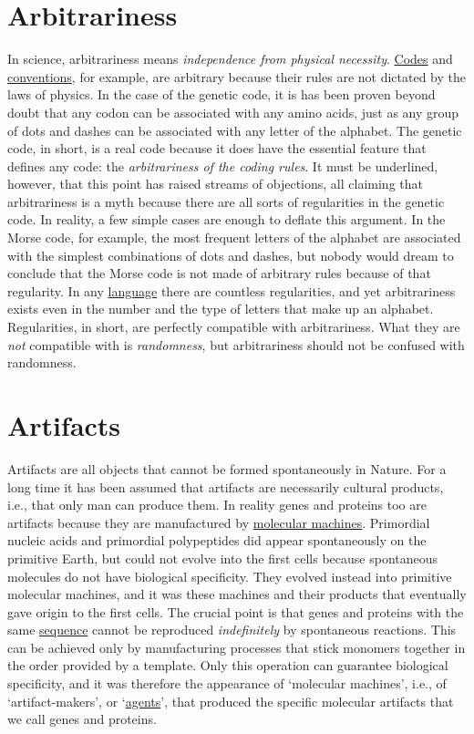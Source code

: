 \documentclass[12pt]{article}
\begin{document}
\section{Arbitrariness}
In science, arbitrariness means \textit{independence from physical necessity}. \hyperlink{code}{Codes} and \hyperlink{convention}{conventions}, for example, are arbitrary because their rules are not dictated by the laws of physics. In the case of the genetic code, it is has been proven beyond doubt that any codon can be associated with any amino acids, just as any group of dots and dashes can be associated with any letter of the alphabet. The genetic code, in short, is a real code because it does have the essential feature that defines any code: the \textit{arbitrariness of the coding rules}. It must be underlined, however, that this point has raised streams of objections, all claiming that arbitrariness is a myth because there are all sorts of regularities in the genetic code. In reality, a few simple cases are enough to deflate this argument. In the Morse code, for example, the most frequent letters of the alphabet are associated with the simplest combinations of dots and dashes, but nobody would dream to conclude that the Morse code is not made of arbitrary rules because of that regularity. In any \hyperlink{language}{language} there are countless regularities, and yet arbitrariness exists even in the number and the type of letters that make up an alphabet. Regularities, in short, are perfectly compatible with arbitrariness. What they are \textit{not} compatible with is \textit{randomness}, but arbitrariness should not be confused with randomness.


\hypertarget{artifacts}{}
\section{Artifacts}
Artifacts are all objects that cannot be formed spontaneously in Nature. For a long time it has been assumed that artifacts are necessarily cultural products, i.e., that only man can produce them. In reality genes and proteins too are artifacts because they are manufactured by \hyperlink{molecular_machines}{molecular machines}. Primordial nucleic acids and primordial polypeptides did appear spontaneously on the primitive Earth, but could not evolve into the first cells because spontaneous molecules do not have biological specificity. They evolved instead into primitive molecular machines, and it was these machines and their products that eventually gave origin to the first cells. The crucial point is that genes and proteins with the same \hyperlink{sequences}{sequence} cannot be reproduced \textit{indefinitely} by spontaneous reactions. This can be achieved only by manufacturing processes that stick monomers together in the order provided by a template. Only this operation can guarantee biological specificity, and it was therefore the appearance of `molecular machines', i.e., of `artifact-makers', or `\hyperlink{agent}{agents}', that produced the specific molecular artifacts that we call genes and proteins. 
\end{document}
